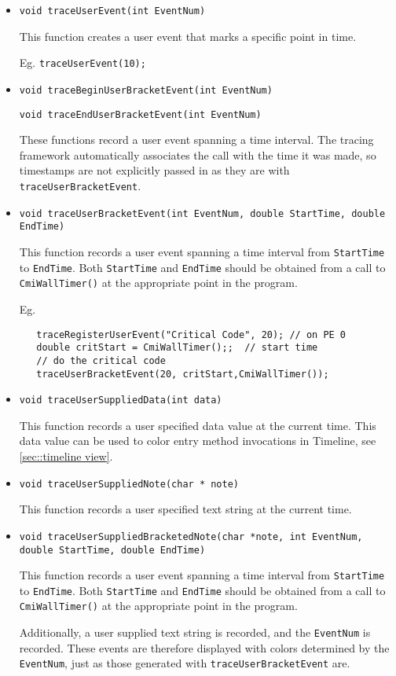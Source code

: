 \begin{itemize}


\item
{\tt void traceUserEvent(int EventNum) }

This function creates a user event that marks a specific point in time.

Eg. {\tt traceUserEvent(10);}

\item
{\tt void traceBeginUserBracketEvent(int EventNum) }

{\tt void traceEndUserBracketEvent(int EventNum) }

These functions record a user event spanning a time interval. The
tracing framework automatically associates the call with the time it
was made, so timestamps are not explicitly passed in as they are with
{\tt traceUserBracketEvent}.

\item
{\tt void traceUserBracketEvent(int EventNum, double StartTime, double EndTime) }

This function records a user event spanning a time interval from {\tt StartTime} to {\tt EndTime}. Both {\tt StartTime} and {\tt EndTime} should be obtained from a call to {\tt CmiWallTimer()} at the appropriate point in the program.

Eg.
\begin{verbatim}
   traceRegisterUserEvent("Critical Code", 20); // on PE 0
   double critStart = CmiWallTimer();;  // start time
   // do the critical code
   traceUserBracketEvent(20, critStart,CmiWallTimer());
\end{verbatim}

\item
{\tt void traceUserSuppliedData(int data) }

This function records a user specified data value at the current
time. This data value can be used to color entry method invocations in
Timeline, see \ref{sec::timeline view}.

\item
{\tt void traceUserSuppliedNote(char * note) }

This function records a user specified text string at the current time.

\item
{\tt void traceUserSuppliedBracketedNote(char *note, int EventNum, double StartTime, double EndTime)}

This function records a user event spanning a time interval from {\tt StartTime} to {\tt EndTime}. Both {\tt StartTime} and {\tt EndTime} should be obtained from a call to {\tt CmiWallTimer()} at the appropriate point in the program.

Additionally, a user supplied text string is recorded, and the  {\tt EventNum} is recorded. These events are therefore displayed with colors determined by the {\tt EventNum}, just as those generated with {\tt traceUserBracketEvent} are.

\end{itemize}

